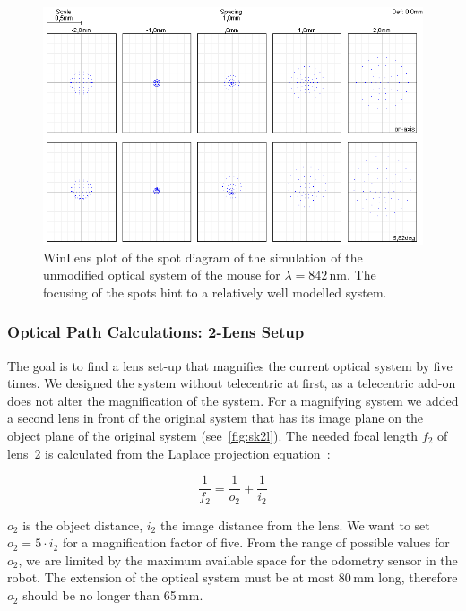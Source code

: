 \documentclass[12pt,a4paper]{article}
\begin{document}
\begin{figure}[htbp]
\begin{center}
\includegraphics[width=1\columnwidth]{figures/spot_diagram_mouse.png}
\caption{\label{fig:ls1_s}
WinLens plot of the spot diagram of the simulation of the unmodified optical system of the mouse for $\lambda = 842$\,nm.
The focusing of the spots hint to a relatively well modelled system.
}
\end{center}
\end{figure}

\subsubsection{Optical Path Calculations: 2-Lens Setup}
\label{opt:2l}

The goal is to find a lens set-up that magnifies the current optical system by five times.
We designed the system without telecentric at first, as a telecentric add-on does not alter the magnification of the system.
For a magnifying system we added a second lens in front of the original system that has its image plane on the object plane of the original system (see~\autoref{fig:sk2l}).
The needed focal length $f_2$ of lens~2 is calculated from the Laplace projection equation~\cite{jaeger}:%

\begin{equation}
\label{eq:1}
\frac{1}{f_2} = \frac{1}{o_2}  + \frac{1}{i_2}
\end{equation}

$o_2$ is the object distance, $i_2$ the image distance from the lens.
We want to set $o_2 = 5 \cdot i_2$ for a magnification factor of five.
From the range of possible values for $o_2$, we are limited by the maximum available space for the odometry sensor in the robot.
The extension of the optical system must be at most 80\,mm long, therefore $o_2$ should be no longer than 65\,mm.
\end{document}
